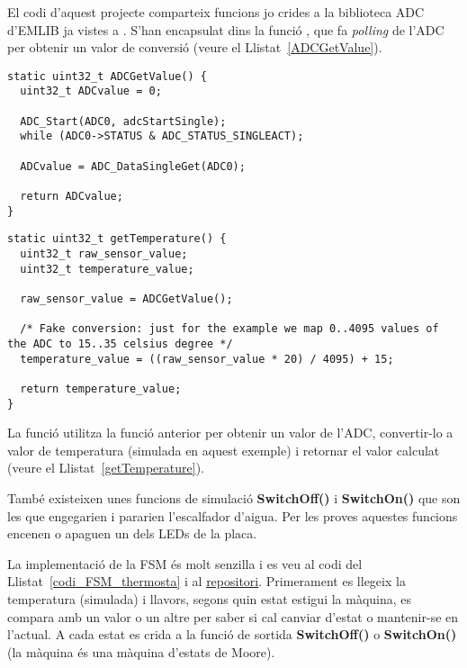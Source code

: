 El codi d'aquest projecte comparteix funcions jo crides a la biblioteca \gls{ADC} d'EMLIB ja vistes a . S'han encapsulat dins la funció , que fa {\em polling} de l'ADC per obtenir un valor de conversió (veure el Llistat~\ref{ADCGetValue}).

\begin{lstlisting}[style=customc,caption=funció ADCGetValue(),label=ADCGetValue]
static uint32_t ADCGetValue() {
  uint32_t ADCvalue = 0;

  ADC_Start(ADC0, adcStartSingle);
  while (ADC0->STATUS & ADC_STATUS_SINGLEACT);
  
  ADCvalue = ADC_DataSingleGet(ADC0);

  return ADCvalue;
}
\end{lstlisting}

\begin{lstlisting}[style=customc,caption=funció getTemperature(),label=getTemperature]
static uint32_t getTemperature() {
  uint32_t raw_sensor_value;
  uint32_t temperature_value;

  raw_sensor_value = ADCGetValue();

  /* Fake conversion: just for the example we map 0..4095 values of the ADC to 15..35 celsius degree */
  temperature_value = ((raw_sensor_value * 20) / 4095) + 15;

  return temperature_value;
}
\end{lstlisting}

La funció  utilitza la funció anterior per obtenir un valor de l'ADC, convertir-lo a valor de temperatura (simulada en aquest exemple) i retornar el valor calculat (veure el Llistat~\ref{getTemperature}).

També existeixen unes funcions de simulació {\bf SwitchOff()} i {\bf SwitchOn()} que son les que engegarien i pararien l'escalfador d'aigua. Per les proves aquestes funcions encenen o apaguen un dels LEDs de la placa.

La implementació de la FSM és molt senzilla i es veu al codi del Llistat~\ref{codi_FSM_thermosta} i al \href{https://github.com/mariusmm/cursembedded/tree/master/Simplicity/FSM_1}{repositori}. Primerament es llegeix la temperatura (simulada) i llavors, segons quin estat estigui la màquina, es compara amb un valor o un altre per saber si cal canviar d'estat o mantenir-se en l'actual. A cada estat es crida a la funció de sortida {\bf SwitchOff()} o {\bf SwitchOn()} (la màquina és una màquina d'estats de Moore).

